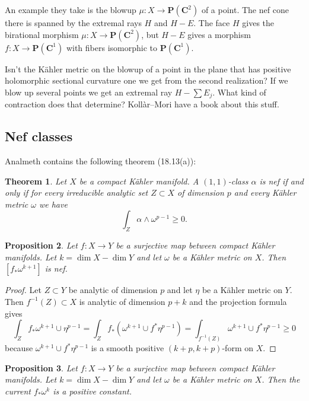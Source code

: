 \documentclass[11pt]{amsart}
\newtheorem{theo}{Theorem}
\newtheorem{prop}[theo]{Proposition}
\theoremstyle{definition}
\def\CC{\mathbf{C}}
\def\PP{\mathbf{P}}
\newcommand{\PC}[1]{\PP(\CC^{#1})}
\begin{document}
An example they take is the blowup $\mu : X \to \PC2$ of a point.
The nef cone there is spanned by the extremal rays $H$ and $H-E$.
The face $H$ gives the birational morphism $\mu : X \to \PC2$, but $H-E$ gives a morphism $f : X \to \PC1$ with fibers isomorphic to $\PC1$.

Isn't the K\"ahler metric on the blowup of a point in the plane that has positive holomorphic sectional curvature one we get from the second realization?
If we blow up several points we get an extremal ray $H - \sum E_j$.
What kind of contraction does that determine?
Koll\`ar--Mori have a book about this stuff.

\subsection*{Nef classes}

Analmeth contains the following theorem (18.13(a)):

\begin{theo}
Let $X$ be a compact K\"ahler manifold.
A $(1,1)$-class $\alpha$ is nef if and only if for every irreducible analytic set $Z \subset X$ of dimension $p$ and every K\"ahler metric $\omega$ we have
\[
\int_Z \alpha \wedge \omega^{p-1} \geq 0.
\]
\end{theo}


\begin{prop}
Let $f : X \to Y$ be a surjective map between compact K\"ahler manifolds.
Let $k = \dim X - \dim Y$ and let $\omega$ be a K\"ahler metric on $X$.
Then $[f_*\omega^{k+1}]$ is nef.
\end{prop}

\begin{proof}
Let $Z \subset Y$ be analytic of dimension $p$ and let $\eta$ be a K\"ahler metric on $Y$.
Then $f^{-1}(Z) \subset X$ is analytic of dimension $p+k$ and the projection formula gives
\[
\int_Z f_*\omega^{k+1} \cup \eta^{p-1}
= \int_Z f_*(\omega^{k+1} \cup f^*\eta^{p-1})
= \int_{f^{-1}(Z)} \omega^{k+1} \cup f^*\eta^{p-1}
\geq 0
\]
because $\omega^{k+1} \cup f^*\eta^{p-1}$ is a smooth positive $(k+p,k+p)$-form on $X$.
\end{proof}


\begin{prop}
Let $f : X \to Y$ be a surjective map between compact K\"ahler manifolds.
Let $k = \dim X - \dim Y$ and let $\omega$ be a K\"ahler metric on $X$.
Then the current $f_*\omega^{k}$ is a positive constant.
\end{prop}
\end{document}
